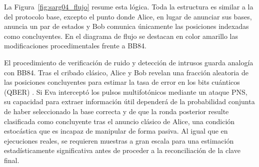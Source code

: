 La Figura~\ref{fig:sarg04_flujo} resume esta lógica. Toda la estructura es similar a la del protocolo base, excepto el punto donde Alice, en lugar de anunciar sus bases, anuncia un par de estados y Bob comunica únicamente las posiciones indexadas como concluyentes. En el diagrama de flujo se destacan en color amarillo las modificaciones procedimentales frente a BB84.

El procedimiento de verificación de ruido y detección de intrusos guarda analogía con BB84. Tras el cribado clásico, Alice y Bob revelan una fracción aleatoria de las posiciones concluyentes para estimar la tasa de error en los bits cuánticos (QBER) \citep{scarani2009}. Si Eva interceptó los pulsos multifotónicos mediante un ataque PNS, su capacidad para extraer información útil dependerá de la probabilidad conjunta de haber seleccionado la base correcta y de que la ronda posterior resulte clasificada como concluyente tras el anuncio clásico de Alice, una condición estocástica que es incapaz de manipular de forma pasiva. Al igual que en ejecuciones reales, se requieren muestras a gran escala para una estimación estadísticamente significativa antes de proceder a la reconciliación de la clave final.
